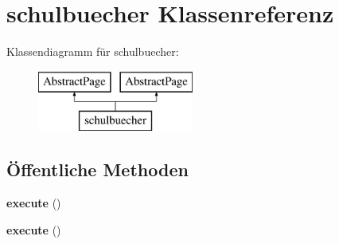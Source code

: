 \hypertarget{classschulbuecher}{}\section{schulbuecher Klassenreferenz}
\label{classschulbuecher}
Klassendiagramm für schulbuecher\+:\begin{figure}[H]
\begin{center}
\leavevmode
\includegraphics[height=2.000000cm]{classschulbuecher}
\end{center}
\end{figure}
\subsection*{Öffentliche Methoden}
\begin{DoxyCompactItemize}
\item 
\mbox{\label{classschulbuecher_ab2b22825bbe8694c39f947f763925658}} 
{\bfseries execute} ()
\item 
\mbox{\label{classschulbuecher_ab2b22825bbe8694c39f947f763925658}} 
{\bfseries execute} ()
\end{DoxyCompactItemize}
